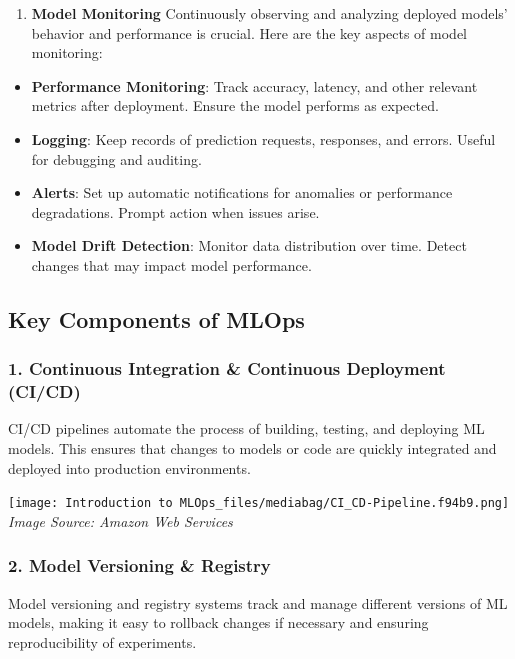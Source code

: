 \documentclass[
  letterpaper,
  DIV=11,
  numbers=noendperiod]{scrartcl}
\providecommand{\tightlist}{%
  \setlength{\itemsep}{0pt}\setlength{\parskip}{0pt}}\usepackage{longtable,booktabs,array}
\begin{document}
\begin{enumerate}
\def\labelenumi{\arabic{enumi}.}
\setcounter{enumi}{5}
\tightlist
\item
  \textbf{Model Monitoring} Continuously observing and analyzing
  deployed models' behavior and performance is crucial. Here are the key
  aspects of model monitoring:
\end{enumerate}

\begin{itemize}
\tightlist
\item
  \textbf{Performance Monitoring}: Track accuracy, latency, and other
  relevant metrics after deployment. Ensure the model performs as
  expected.
\item
  \textbf{Logging}: Keep records of prediction requests, responses, and
  errors. Useful for debugging and auditing.
\item
  \textbf{Alerts}: Set up automatic notifications for anomalies or
  performance degradations. Prompt action when issues arise.
\item
  \textbf{Model Drift Detection}: Monitor data distribution over time.
  Detect changes that may impact model performance.
\end{itemize}

\subsection{Key Components of MLOps}\label{key-components-of-mlops}

\subsubsection{1. Continuous Integration \& Continuous Deployment
(CI/CD)}\label{continuous-integration-continuous-deployment-cicd}

CI/CD pipelines automate the process of building, testing, and deploying
ML models. This ensures that changes to models or code are quickly
integrated and deployed into production environments.

\texttt{[image: Introduction to MLOps\_files/mediabag/CI\_CD-Pipeline.f94b9.png]}
\emph{Image Source: Amazon Web Services}

\subsubsection{2. Model Versioning \&
Registry}\label{model-versioning-registry}

Model versioning and registry systems track and manage different
versions of ML models, making it easy to rollback changes if necessary
and ensuring reproducibility of experiments.
\end{document}
